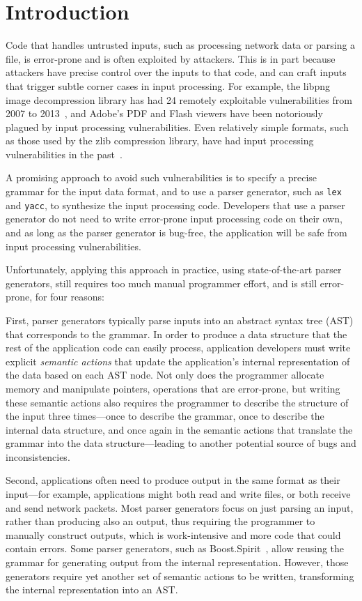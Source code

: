 \section{Introduction}

Code that handles untrusted inputs, such as processing network
data or parsing a file, is error-prone and is often exploited by
attackers.  This is in part because attackers have precise control
over the inputs to that code, and can craft inputs that trigger
subtle corner cases in input processing.  For example, the libpng image decompression
library has had 24 remotely exploitable vulnerabilities from 2007 to
2013~\cite{cvedetails:libpng},
and Adobe's PDF and Flash viewers have been notoriously
plagued by input processing vulnerabilities.  Even relatively
simple formats, such as those used by the zlib compression
library, have had input processing vulnerabilities in the
past~\cite{cvedetails:zlib}.

A promising approach to avoid such vulnerabilities is to specify
a precise grammar for the input data format, and to use a parser
generator, such as {\tt lex} and {\tt yacc}, to synthesize the input
processing code.  Developers that use a parser generator do not need
to write error-prone input processing code on their own, and as long
as the parser generator is bug-free, the application will be safe from
input processing vulnerabilities.

Unfortunately, applying this approach in practice, using state-of-the-art
parser generators, still requires too much manual programmer effort,
and is still error-prone, for four reasons:

First, parser generators typically parse inputs into an abstract syntax
tree (AST) that corresponds to the grammar.  In order to produce a data
structure that the rest of the application code can easily process,
application developers must write explicit {\em semantic actions} that
update the application's internal representation of the data based on
each AST node.  Not only does the programmer allocate memory and manipulate pointers,
 operations that are error-prone, but
writing these semantic actions
also requires the programmer to describe the structure of the input three
times---once to describe the grammar, once to describe the internal data
structure, and once again in the semantic actions that translate the
grammar into the data structure---leading to another potential source
of bugs and inconsistencies.

Second,  applications often need to produce output in the same
format as their input---for example, applications might both
read and write files, or both receive and send network packets.
Most parser generators focus on just parsing an input, rather
than producing also an output, thus requiring the programmer to manually
construct outputs, which is work-intensive and more code that could contain errors.
Some parser generators, such as
Boost.Spirit~\cite{boost-spirit},
allow reusing the grammar for generating output from the internal
representation.  However, those generators require yet another set of
semantic actions to be written, transforming the internal representation
into an AST\@.

